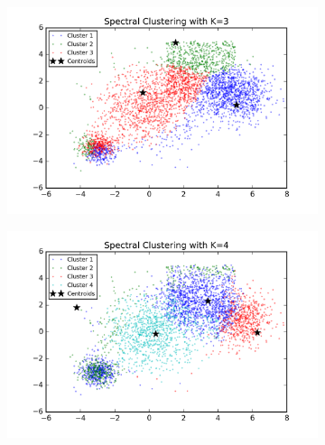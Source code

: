 \begin{description}
\begin{description}
\begin{figure}[!h]
        \centering
        \begin{subfigure}[b]{0.475\textwidth}
            \centering
            \includegraphics[width=\textwidth]{./figures/bigClustering_spectral_3.png}
        \end{subfigure}
        \hfill
        \begin{subfigure}[b]{0.475\textwidth}  
            \centering 
            \includegraphics[width=\textwidth]{./figures/bigClustering_spectral_4.png}
        \end{subfigure}
        \begin{subfigure}[b]{0.475\textwidth}  
            \centering 

\end{subfigure}
\end{figure}
\end{description}
\end{description}
